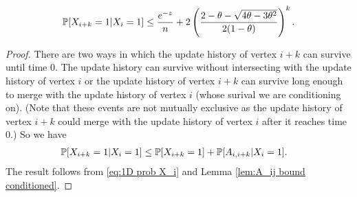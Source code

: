 	\begin{lemma}
		\label{lem:X_i+k given X_i}
		\begin{equation}
			\label{eq:prob X_i+k = 1|X_i = 1}
			\mathbb{P}[X_{i+k} = 1| X_i = 1] \leq \frac{e^{-z}}{n} + 2\left(\frac{2 - \theta - \sqrt{4\theta - 3\theta^2}}{2(1 - \theta)}\right)^k.
		\end{equation}
	\end{lemma}
	\begin{proof}
		There are two ways in which the update history of vertex $i+k$ can survive until time $0$. The update history can survive without intersecting with the update history of vertex $i$ or the update history of vertex $i+k$ can survive long enough to merge with the update history of vertex $i$ (whose surival we are conditioning on). (Note that these events are not mutually exclusive as the update history of vertex $i+k$ could merge with the update history of vertex $i$ after it reaches time $0$.) So we have
		\begin{align}
			\mathbb{P}[X_{i+k} = 1| X_i = 1] &\leq \mathbb{P}[X_{i+k} = 1] + \mathbb{P}[A_{i,i+k} | X_i = 1].
		\end{align}
		The result follows from \eqref{eq:1D prob X_i} and Lemma \ref{lem:A_ij bound conditioned}.


	\end{proof}